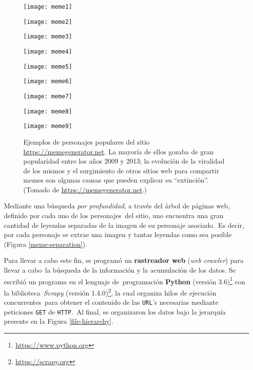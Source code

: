 \begin{figure}[h]
  \centering
  \begin{minipage}[l]{0.3\linewidth}
    \texttt{[image: meme1]}
  \end{minipage}\hfill
  \begin{minipage}[r]{0.3\linewidth}
    \texttt{[image: meme2]}
  \end{minipage}\hfill
  \begin{minipage}[r]{0.3\linewidth}
    \texttt{[image: meme3]}
  \end{minipage}
  \begin{minipage}[r]{0.3\linewidth}
    \texttt{[image: meme4]}
  \end{minipage}\hfill
  \begin{minipage}[r]{0.3\linewidth}
    \texttt{[image: meme5]}
  \end{minipage}\hfill
  \begin{minipage}[r]{0.3\linewidth}
    \texttt{[image: meme6]}
  \end{minipage}
  \begin{minipage}[r]{0.3\linewidth}
    \texttt{[image: meme7]}
  \end{minipage}\hfill
  \begin{minipage}[r]{0.3\linewidth}
    \texttt{[image: meme8]}
  \end{minipage}\hfill
  \begin{minipage}[r]{0.3\linewidth}
    \texttt{[image: meme9]}
  \end{minipage}
  \caption{
    Ejemplos de personajes populares del sitio \url{https://memegenerator.net}.
    La mayoría de ellos gozaba de gran popularidad entre los años 2009 y 2013;
    la evolución de la viralidad de los mismos y el surgimiento de otros sitios web
    para compartir memes son algunas causas que pueden explicar su ``extinción''.
    (Tomado de \url{https://memegenerator.net}.)
  }
  \label{meme-characters}
\end{figure}

Mediante una búsqueda \emph{por profundidad}, a través del árbol de páginas web, definido por cada uno de los personajes\
del sitio, uno encuentra una gran cantidad de leyendas separadas de la imagen de su personaje asociado.\
Es decir, por cada personaje se extrae una imagen y tantas leyendas como sea posible (Figura \ref{meme-separation}).\par
Para llevar a cabo este fin, se programó un \textbf{rastreador web} (\emph{web crawler}) para llevar a cabo\
la búsqueda de la información y la acumulación de los datos. Se escribió un programa en el lenguaje de\
programación \textbf{Python} (versión 3.6)\footnote{\url{https://www.python.org}} con la biblioteca\
\textit{Scrapy} (versión 1.4.0)\footnote{\url{https://scrapy.org}}, la cual organiza hilos de ejecución concurrentes\
para obtener el contenido de las \verb+URL+'s necesarias mediante peticiones \verb+GET+ de \verb+HTTP+.\
Al final, se organizaron los datos bajo la jerarquía presente en la Figura \ref{file-hierarchy}.

